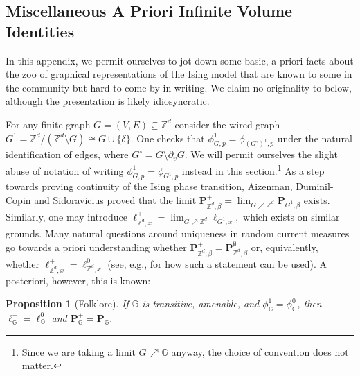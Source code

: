 \documentclass[article,11pt,reqno]{amsart}
\newcommand{\Z}{\mathbb{Z}}
\newcommand{\Prbcur}{\mathbf{P}}
\newtheorem{proposition}[theorem]{Proposition}
\begin{document}
\begin{appendix} %
\section{Miscellaneous A Priori Infinite Volume Identities} \label{sec:A_priori_inf}
In this appendix, we permit ourselves to jot down some basic, a priori facts about the zoo of graphical representations of the Ising model that are known to some in the community but hard to come by in writing. We claim no originality to  below, although the presentation is likely idiosyncratic.

For any finite graph $G=(V,E)\subseteq \Z^d$ consider the wired graph $G^1=\mathbb{Z}^d/(\mathbb{Z}^d\setminus G)\cong G\cup\{\delta\}$. One checks that $\phi^1_{G,p}=\phi_{(G^{\circ})^1,p}$ under the natural identification of edges, where $G^{\circ}=G\setminus \partial_vG.$ We will permit ourselves the slight abuse of notation of writing $\phi^1_{G,p}=\phi_{G^1,p}$ instead in this section.\footnote{Since we are taking a limit $G\nearrow \mathbb{G}$ anyway, the choice of convention does not matter.}
As a step towards proving continuity of the Ising phase transition, Aizenman, Duminil-Copin and Sidoravicius  \cite{aizenman2015random} proved that the limit $\Prbcur_{\Z^d,\beta}^+=\lim_{G\nearrow \Z^d}\Prbcur_{G^1,\beta}$ exists. Similarly, one may introduce $\ell^+_{\Z^d,x}=\lim_{G\nearrow \Z^d} \ell_{G^1,x},$ which exists on similar grounds. Many natural questions around uniqueness in random current measures go towards a priori understanding whether $\Prbcur_{\Z^d,\beta}^+=\Prbcur_{\Z^d,\beta}^{\emptyset}$  or, equivalently, whether $\ell^+_{\Z^d,x}=\ell^0_{\mathbb{Z}^d,x}$ (see, e.g., \cite{hansen2026enddoublerandomcurrent} for how such a statement can be used). A posteriori, however, this is known:
\begin{proposition}[Folklore] \label{Prop:Folklore}
If $\mathbb{G}$ is transitive, amenable, and $\phi_\mathbb{G}^1=\phi_\mathbb{G}^0$, then $\ell_\mathbb{G}^+=\ell_\mathbb{G}^0$ and $\mathbf{P}_\mathbb{G}^+=\mathbf{P}_\mathbb{G}.$
\end{proposition}


\end{appendix}
\end{document}
